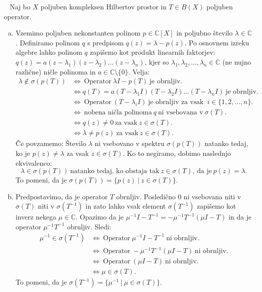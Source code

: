 \documentclass[12pt,a4paper,oneside,fleqn,openany]{book}
\newcommand{\eopf}{\raisebox{0.8ex}{\framebox{}}} %
\newenvironment{dokaz}%
{\noindent{\bf Dokaz.}\ }%
{\hfill\eopf\par\bigskip}%
\newcommand{\C}{\mathbb{C}}
\begin{document}
\begin{dokaz}
	Naj bo $X$ poljuben kompleksen Hilbertov prostor in $T\in B(X)$ poljuben operator.
	\begin{enumerate}[a)]
		\item Vzemimo poljuben nekonstanten polinom $p\in\C[X]$ in poljubno število $\lambda\in\C$. Definiramo polinom $q$ s predpisom $q(z) = \lambda - p(z)$. Po osnovnem izreku algebre lahko polinom $q$ zapišemo kot produkt linearnih faktorjev: $q(z) = a(z-\lambda_1)(z-\lambda_2)\ldots(z-\lambda_n)$, kjer so $\lambda_1, \lambda_2,\ldots, \lambda_n\in\C$ (ne nujno različne) ničle polinoma in $a\in\C\setminus\{0\}$.
		Velja: \begin{align*}
			\lambda\notin \sigma(p(T)) &\iff~\text{Operator}~\lambda I - p(T)~ \text{je obrnljiv.} \\
			&\iff q(T)=a(T-\lambda_1 I)(T-\lambda_2 I)\ldots(T-\lambda_n I)~\text{je obrnljiv.} \\
			&\iff~\text{Operator}~(T-\lambda_i I)~\text{je obrnljiv za vsak }~i\in\{1, 2, \ldots, n\}. \\
			&\iff~\text{nobena ničla polinoma}~q~\text{ni vsebovana v}~\sigma(T). \\
			&\iff q(z)\neq 0~\text{za vsak}~z\in\sigma(T). \\
			&\iff \lambda\neq p(z)~\text{za vsak}~z\in\sigma(T).			
		\end{align*}
		Če povzamemo: Število $\lambda$ ni vsebovano v spektru $\sigma(p(T))$ natanko tedaj, ko je $p(z)\neq \lambda$ za vsak $z\in\sigma(T)$. Ko to negiramo, dobimo naslednjo ekvivalenco: $$\lambda\in\sigma(p(T))~\text{natanko tedaj, ko obstaja tak}~z\in\sigma(T),~\text{da je}~p(z) = \lambda.$$ To pomeni, da je $\sigma(p(T))=\{p(z)~|~z\in\sigma(T)\}$.
		\item Predpostavimo, da je operator $T$ obrnljiv. Posledično $0$ ni vsebovana niti v $\sigma(T)$ niti v $\sigma(T^{-1})$ in zato lahko vsak element $\sigma(T^{-1})$ zapišemo kot inverz nekega $\mu\in\C$. Opazimo da je $\mu^{-1}I - T^{-1} = -\mu^{-1}T^{-1}(\mu I - T)$ in da je operator $\mu^{-1}T^{-1}$ obrnljiv. Sledi: \begin{align*}
			\mu^{-1}\in\sigma(T^{-1}) &\iff~\text{Operator}~\mu^{-1}I - T^{-1}~\text{ni obrnljiv.} \\
			&\iff~\text{Operator}~-\mu^{-1}T^{-1}(\mu I - T)~\text{ni obrnljiv.}\\
			&\iff~\text{Operator}~(\mu I - T)~\text{ni obrnljiv.} \\
			&\iff \mu\in\sigma(T).
		\end{align*}
		To pomeni, da je $\sigma(T^{-1})=\{\mu^{-1}~|~\mu\in\sigma(T)\}$.
	\end{enumerate}
\end{dokaz}
\end{document}
